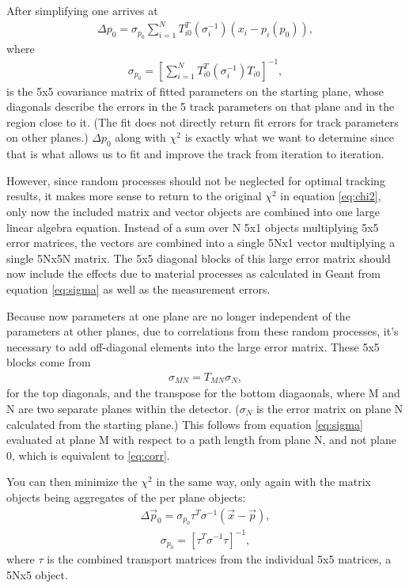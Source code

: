     After simplifying one arrives at 
        \begin{align} \label{eq:deltap}
            \Delta p_{0} = \sigma_{p_{0}} \sum_{i=1}^{N} T^{T}_{i0}(\sigma_{i}^{-1})(x_{i} - p_{i}(p_{0})),
        \end{align}
    where
        \begin{align} \label{eq:cov}
            \sigma_{p_{0}} = [\sum_{i=1}^{N} T^{T}_{i0} (\sigma_{i}^{-1}) T_{i0} ]^{-1},
        \end{align}
    is the 5x5 covariance matrix of fitted parameters on the starting plane, whose diagonals describe the errors in the 5 track parameters on that plane and in the region close to it. (The fit does not directly return fit errors for track parameters on other planes.) $\Delta p_{0}$ along with $\chi^2$ is exactly what we want to determine since that is what allows us to fit and improve the track from iteration to iteration.

    However, since random processes should not be neglected for optimal tracking results, it makes more sense to return to the original $\chi^2$ in equation \ref{eq:chi2}, only now the included matrix and vector objects are combined into one large linear algebra equation. Instead of a sum over N 5x1 objects multiplying 5x5 error matrices, the vectors are combined into a single 5Nx1 vector multiplying a single 5Nx5N matrix. The 5x5 diagonal blocks of this large error matrix should now include the effects due to material processes as calculated in Geant from equation \ref{eq:sigma} as well as the measurement errors. 

    Because now parameters at one plane are no longer independent of the parameters at other planes, due to correlations from these random processes, it's necessary to add off-diagonal elements into the large error matrix. These 5x5 blocks come from 
        \begin{align} \label{eq:corr}
            \sigma_{MN} = T_{MN} \sigma_{N}, 
        \end{align}
    for the top diagonals, and the transpose for the bottom diagaonals, where M and N are two separate planes within the detector. ($\sigma_{N}$ is the error matrix on plane N calculated from the starting plane.) This follows from equation \ref{eq:sigma} evaluated at plane M with respect to a path length from plane N, and not plane 0, which is equivalent to \ref{eq:corr}. 

    You can then minimize the $\chi^{2}$ in the same way, only again with the matrix objects being aggregates of the per plane objects:
        \begin{align} \label{eq:deltafull}
            \Delta \vec{p}_{0} = \sigma_{p_{0}} \tau^{T}\sigma^{-1}(\vec{x}-\vec{p}),
        \end{align}
        \begin{align} \label{eq:covfull}
            \sigma_{p_{0}} = [\tau^{T} \sigma^{-1} \tau ]^{-1},
        \end{align}
    where $\tau$ is the combined transport matrices from the individual 5x5 matrices, a 5Nx5 object.

